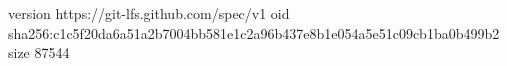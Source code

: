 version https://git-lfs.github.com/spec/v1
oid sha256:c1c5f20da6a51a2b7004bb581e1c2a96b437e8b1e054a5e51c09cb1ba0b499b2
size 87544
